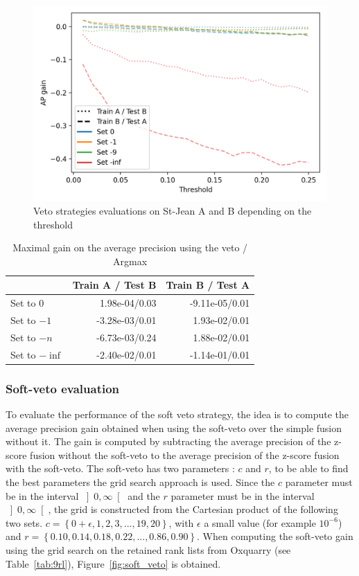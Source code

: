 \begin{figure}
  \caption{Veto strategies evaluations on St-Jean A and B depending on the threshold}
  \label{fig:veto}
  \includegraphics[width=\linewidth]{img/veto.png}
\end{figure}

\begin{table}
  \centering
  \caption{Maximal gain on the average precision using the veto / Argmax}
  \label{tab:veto}
  \begin{tabular}{l r r}
    \toprule
                   & Train A / Test B & Train B / Test A \\
    \midrule
    Set to $0$     & 1.98e-04/0.03 & -9.11e-05/0.01 \\
    Set to $-1$    & -3.28e-03/0.01 & 1.93e-02/0.01 \\
    Set to $-n$    & -6.73e-03/0.24 & 1.88e-02/0.01 \\
    Set to $-\inf$ & -2.40e-02/0.01 & -1.14e-01/0.01 \\
    \bottomrule
  \end{tabular}
\end{table}

\subsubsection{Soft-veto evaluation}

To evaluate the performance of the soft veto strategy, the idea is to compute the average precision gain obtained when using the soft-veto over the simple fusion without it.
The gain is computed by subtracting the average precision of the z-score fusion without the soft-veto to the average precision of the z-score fusion with the soft-veto.
The soft-veto has two parameters : $c$ and $r$, to be able to find the best parameters the grid search approach is used.
Since the $c$ parameter must be in the interval $\left]0, \infty\right[$ and the $r$ parameter must be in the interval $\left]0, \infty\right[$, the grid is constructed from the Cartesian product of the following two sets.
$c = \left\{0 + \epsilon, 1, 2, 3, ..., 19, 20\right\}$, with $\epsilon$ a small value (for example $10^{-6}$) and $r = \left\{0.10, 0.14, 0.18, 0.22, ..., 0.86, 0.90\right\}$.
When computing the soft-veto gain using the grid search on the retained rank lists from Oxquarry (see Table~\ref{tab:9rl}), Figure~\ref{fig:soft_veto} is obtained.

